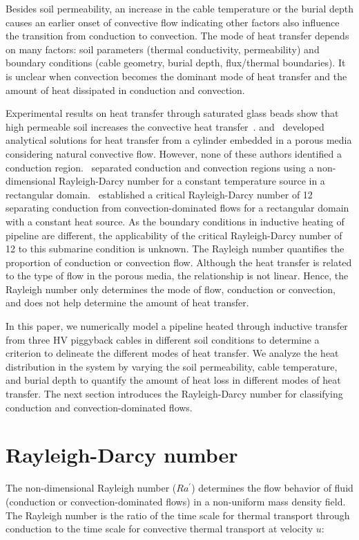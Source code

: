 \documentclass[Journal,letterpaper,InsideFigs]{ascelike-new}
\begin{document}
Besides soil permeability, an increase in the cable temperature or the burial depth causes an earlier onset of convective flow indicating other factors also influence the transition from conduction to convection. The mode of heat transfer depends on many factors: soil parameters (thermal conductivity, permeability) and boundary conditions (cable geometry, burial depth, flux/thermal boundaries). It is unclear when convection becomes the dominant mode of heat transfer and the amount of heat dissipated in conduction and convection. 

Experimental results on heat transfer through saturated glass beads show that high permeable soil increases the convective heat transfer~\cite{fand1986natural}.  and~ developed analytical solutions for heat transfer from a cylinder embedded in a porous media considering natural convective flow. However, none of these authors identified a conduction region.~  separated conduction and convection regions using a non-dimensional Rayleigh-Darcy number for a constant temperature source in a rectangular domain.~ established a critical Rayleigh-Darcy number of 12 separating conduction from convection-dominated flows for a rectangular domain with a constant heat source. As the boundary conditions in inductive heating of pipeline are different, the applicability of the critical Rayleigh-Darcy number of 12 to this submarine condition is unknown. The Rayleigh number quantifies the proportion of conduction or convection flow. Although the heat transfer is related to the type of flow in the porous media, the relationship is not linear. Hence, the Rayleigh number only determines the mode of flow, conduction or convection, and does not help determine the amount of heat transfer.

In this paper, we numerically model a pipeline heated through inductive transfer from three HV piggyback cables in different soil conditions to determine a criterion to delineate the different modes of heat transfer. We analyze the heat distribution in the system by varying the soil permeability, cable temperature, and burial depth to quantify the amount of heat loss in different modes of heat transfer. The next section introduces the Rayleigh-Darcy number for classifying conduction and convection-dominated flows. 

\section{Rayleigh-Darcy number}
The non-dimensional Rayleigh number ($Ra^\prime$) determines the flow behavior of fluid (conduction or convection-dominated flows) in a non-uniform mass density field. The Rayleigh number is the ratio of the time scale for thermal transport through conduction to the time scale for convective thermal transport at velocity $u$:
\end{document}
